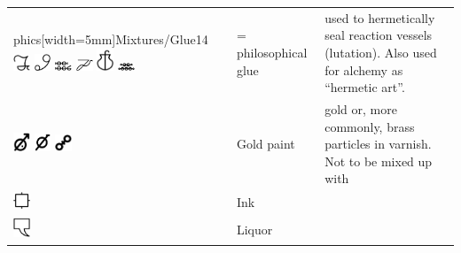 \documentclass[british,final,landscape]{scrartcl}
\begin{document}
\begin{refsection}
\begin{supertabular}{p{0.3\textwidth}p{0.34\textwidth}p{0.34\textwidth}}
phics[width=5mm]{Mixtures/Glue14} \includegraphics[width=5mm]{Mixtures/Glue15} \includegraphics[width=5mm]{Mixtures/Glue16} \includegraphics[width=5mm]{Mixtures/Glue17} \includegraphics[width=5mm]{Mixtures/Glue18} \includegraphics[width=5mm]{Mixtures/Glue19} \includegraphics[width=5mm]{Mixtures/Glue20} &  = philosophical glue & used to hermetically seal reaction vessels (lutation). Also used for alchemy as ``hermetic art''.\\
   \includegraphics[width=5mm]{Mixtures/GoldPaint} \includegraphics[width=5mm]{Mixtures/GoldPaint2} \includegraphics[width=5mm]{Mixtures/GoldPaint3} & Gold paint & gold or, more commonly, brass particles in varnish. Not to be mixed up with  \\
   \includegraphics[width=5mm]{Mixtures/Ink} & Ink & \\
   \includegraphics[width=5mm]{Mixtures/Liquor} & Liquor & \\

\end{supertabular}
\end{refsection}
\end{document}
